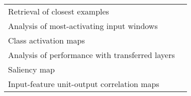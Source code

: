 \begin{tabular}{ll}
Retrieval of closest examples                          &                                                                                                                                                                                  \cite{Deiss2018} \\
Analysis of most-activating input windows              &                                                                                                                                                                              \cite{Hartmann2018b} \\
Class activation maps                                  &                                                                                                                                                                                  \cite{Ghosh2018} \\
Analysis of performance with transferred layers        &                                                                                                                                                                            \cite{Hajinoroozi2017} \\
Saliency map                                           &                                                                                                                                                                               \cite{Vilamala2017} \\
Input-feature unit-output correlation maps             &                                                                                                                                                                          \cite{Schirrmeister2017} \\
\bottomrule
\end{tabular}
